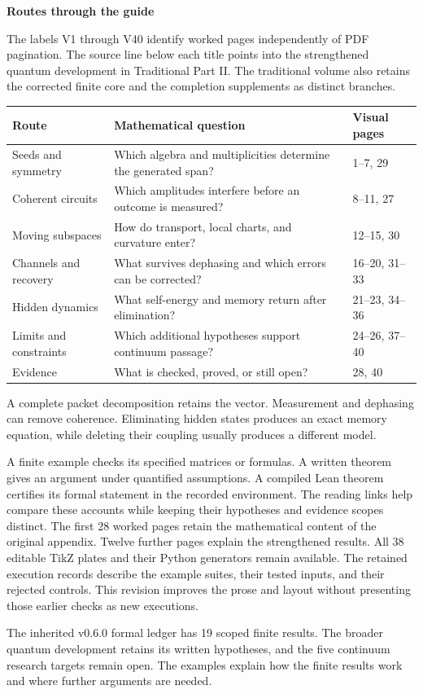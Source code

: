 {\sffamily\bfseries\Large\color{accent}Routes through the guide\par}\vspace{12pt}
The labels V1 through V40 identify worked pages independently of PDF pagination. The source line below each title points into the strengthened quantum development in Traditional Part II. The traditional volume also retains the corrected finite core and the completion supplements as distinct branches.
\begin{center}\small
\begin{tabularx}{\linewidth}{@{}p{1.5in}Yl@{}}\toprule
Route & Mathematical question & Visual pages\\\midrule
Seeds and symmetry & Which algebra and multiplicities determine the generated span? & 1--7, 29\\
Coherent circuits & Which amplitudes interfere before an outcome is measured? & 8--11, 27\\
Moving subspaces & How do transport, local charts, and curvature enter? & 12--15, 30\\
Channels and recovery & What survives dephasing and which errors can be corrected? & 16--20, 31--33\\
Hidden dynamics & What self-energy and memory return after elimination? & 21--23, 34--36\\
Limits and constraints & Which additional hypotheses support continuum passage? & 24--26, 37--40\\
Evidence & What is checked, proved, or still open? & 28, 40\\\bottomrule
\end{tabularx}
\end{center}
A complete packet decomposition retains the vector. Measurement and dephasing can remove coherence. Eliminating hidden states produces an exact memory equation, while deleting their coupling usually produces a different model.

A finite example checks its specified matrices or formulas. A written theorem gives an argument under quantified assumptions. A compiled Lean theorem certifies its formal statement in the recorded environment. The reading links help compare these accounts while keeping their hypotheses and evidence scopes distinct.
The first 28 worked pages retain the mathematical content of the original appendix. Twelve further pages explain the strengthened results. All 38 editable TikZ plates and their Python generators remain available. The retained execution records describe the example suites, their tested inputs, and their rejected controls. This revision improves the prose and layout without presenting those earlier checks as new executions.

The inherited v0.6.0 formal ledger has 19 scoped finite results. The broader quantum development retains its written hypotheses, and the five continuum research targets remain open. The examples explain how the finite results work and where further arguments are needed.
